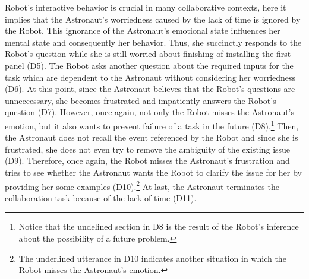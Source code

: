 Robot's interactive behavior is crucial in many collaborative contexts, here it
implies that the Astronaut's worriedness caused by the lack of time is ignored
by the Robot. This ignorance of the Astronaut's emotional state influences her
mental state and consequently her behavior. Thus, she succinctly responds to
the Robot's question while she is still worried about finishing of installing
the first panel (D5). The Robot asks another question about the required inputs
for the task which are dependent to the Astronaut without considering her
worriedness (D6). At this point, since the Astronaut believes that the Robot's
questions are unneccessary, she becomes frustrated and impatiently answers the
Robot's question (D7). However, once again, not only the Robot misses the
Astronaut's emotion, but it also wants to prevent failure of a task in the
future (D8).\footnote{Notice that the undelined section in D8 is the result of
the Robot's inference about the possibility of a future problem.} Then, the
Astronaut does not recall the event referenced by the Robot and since she is
frustrated, she does not even try to remove the ambiguity of the existing issue
(D9). Therefore, once again, the Robot misses the Astronaut's frustration and
tries to see whether the Astronaut wants the Robot to clarify the issue for her
by providing her some examples (D10).\footnote{The underlined utterance in D10
indicates another situation in which the Robot misses the Astronaut's emotion.}
At last, the Astronaut terminates the collaboration task because of the lack of
time (D11).\\

